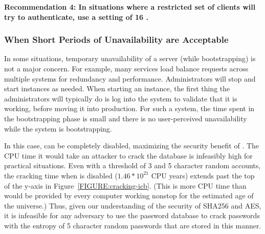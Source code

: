 {\bf Recommendation 4: In situations where a restricted set of clients will
try to authenticate, use a setting of 16 \partialbytes.}


\subsubsection{When Short Periods of Unavailability are Acceptable}

In some situations, temporary unavailability of a server (while bootstrapping)
is not a major concern.  For example, many services load balance 
requests across multiple systems for redundancy and performance.  
Administrators will stop and start instances as needed.  When starting
an instance, the first thing the administrators will typically do is log into
the system to validate that it is working, before moving it into production.
For such a system, the time spent in the bootstrapping phase is small
and there is no user-perceived unavailability while the system is 
bootstrapping.

In this case, \partialverification can be completely disabled, maximizing
the security benefit of \PPH.  The CPU time it would take an attacker to crack 
the database is infeasibly high for practical situations.  
Even with a threshold of 3 and 5 character random accounts, the cracking time 
when \partialverification is disabled ($1.46*10^{21}$ CPU years) extends past the 
top of the y-axis 
in Figure~\ref{FIGURE:cracking-icb}.  (This is more CPU time than would be 
provided by every computer working nonstop for the estimated 
age of the universe.)   Thus, given our understanding of the security of
SHA256 and AES, it is infeasible for any adversary to use the password
database to crack passwords with the entropy of 5 character random
passwords that are stored in this manner.

